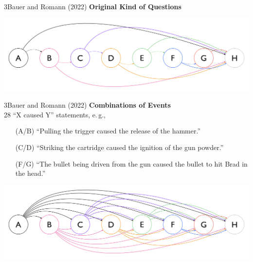 \documentclass[xcolor=table,9pt,aspectratio=169]{beamer}
\begin{document}
\begin{frame}{\vspace*{10mm}3\hspace*{1em}Bauer and Romann (2022)}
\vspace*{-5mm}
\textbf{Original Kind of Questions}\\
\begin{center}
   \includegraphics[width=.8\linewidth]{figures/combinations_3.pdf}
\end{center}
\end{frame}


\begin{frame}{\vspace*{10mm}3\hspace*{1em}Bauer and Romann (2022)}
\vspace*{-5mm}
\textbf{Combinations of Events}\\
28 ``X caused Y'' statements, e.\,g.,
\begin{itemize}
   \item[(A/B)] ``Pulling the trigger caused the release of the hammer.''
   \item[(C/D)] ``Striking the cartridge caused the ignition of the gun powder.''
   \item[(F/G)] ``The bullet being driven from the gun caused the bullet to hit Brad in the head.''
\end{itemize}
\hfill
\begin{center}
   \includegraphics[width=.8\linewidth]{figures/combinations.pdf}
\end{center}
\end{frame}
\end{document}
